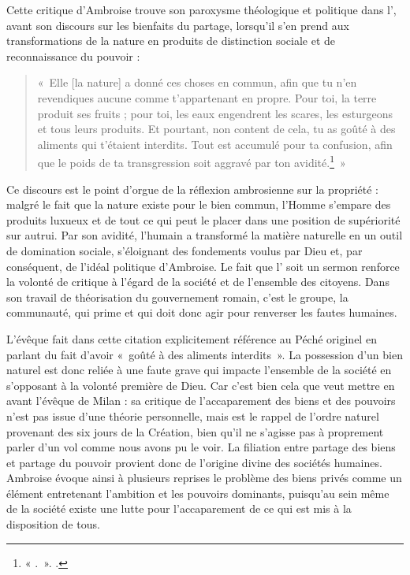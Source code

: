 \bigskip

Cette critique d'Ambroise trouve son paroxysme théologique et politique dans l', avant son discours sur les bienfaits du partage, lorsqu'il s'en prend aux transformations de la nature en produits de distinction sociale et de reconnaissance du pouvoir :

\bigskip

\begin{quote}
    «~Elle [la nature] a donné ces choses en commun, afin que tu n'en revendiques aucune comme t'appartenant en propre. Pour toi, la terre produit ses fruits ; pour toi, les eaux engendrent les scares, les esturgeons et tous leurs produits. Et pourtant, non content de cela, tu as goûté à des aliments qui t'étaient interdits. Tout est accumulé pour ta confusion, afin que le poids de ta transgression soit aggravé par ton avidité.\footnote{« .~». \cite[\nopp V, 1, 2]{ambroise_csel_32_1}.}~»
\end{quote}

\bigskip

Ce discours est le point d'orgue de la réflexion ambrosienne sur la propriété : malgré le fait que la nature existe pour le bien commun, l'Homme s'empare des produits luxueux et de tout ce qui peut le placer dans une position de supériorité sur autrui. Par son avidité, l'humain a transformé la matière naturelle en un outil de domination sociale, s'éloignant des fondements voulus par Dieu et, par conséquent, de l'idéal politique d'Ambroise. Le fait que l' soit un sermon renforce la volonté de critique à l'égard de la société et de l'ensemble des citoyens. Dans son travail de théorisation du gouvernement romain, c'est le groupe, la communauté, qui prime et qui doit donc agir pour renverser les fautes humaines.

\bigskip

L'évêque fait dans cette citation explicitement référence au Péché originel en parlant du fait d'avoir «~goûté à des aliments interdits~». La possession d'un bien naturel est donc reliée à une faute grave qui impacte l'ensemble de la société en s'opposant à la volonté première de Dieu. Car c'est bien cela que veut mettre en avant l'évêque de Milan : sa critique de l'accaparement des biens et des pouvoirs n'est pas issue d'une théorie personnelle, mais est le rappel de l'ordre naturel provenant des six jours de la Création, bien qu'il ne s'agisse pas à proprement parler d'un vol comme nous avons pu le voir. La filiation entre partage des biens et partage du pouvoir provient donc de l'origine divine des sociétés humaines. Ambroise évoque ainsi à plusieurs reprises le problème des biens privés comme un élément entretenant l'ambition et les pouvoirs dominants, puisqu'au sein même de la société existe une lutte pour l'accaparement de ce qui est mis à la disposition de tous.


